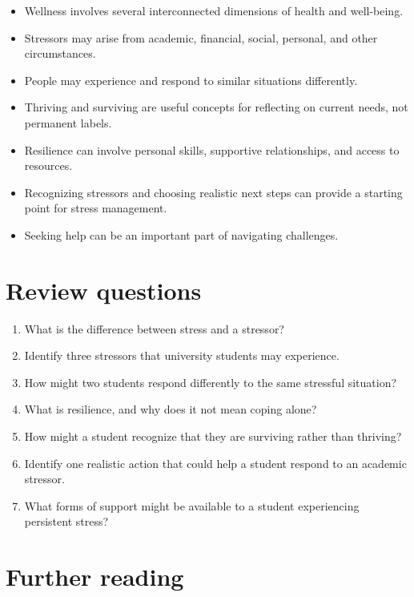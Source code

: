 \documentclass[
  letterpaper,
]{book}
\providecommand{\tightlist}{%
  \setlength{\itemsep}{0pt}\setlength{\parskip}{0pt}}
\begin{document}
\begin{itemize}
\tightlist
\item
  Wellness involves several interconnected dimensions of health and
  well-being.
\item
  Stressors may arise from academic, financial, social, personal, and
  other circumstances.
\item
  People may experience and respond to similar situations differently.
\item
  Thriving and surviving are useful concepts for reflecting on current
  needs, not permanent labels.
\item
  Resilience can involve personal skills, supportive relationships, and
  access to resources.
\item
  Recognizing stressors and choosing realistic next steps can provide a
  starting point for stress management.
\item
  Seeking help can be an important part of navigating challenges.
\end{itemize}

\section{Review questions}\label{review-questions}

\begin{enumerate}
\def\labelenumi{\arabic{enumi}.}
\tightlist
\item
  What is the difference between stress and a stressor?
\item
  Identify three stressors that university students may experience.
\item
  How might two students respond differently to the same stressful
  situation?
\item
  What is resilience, and why does it not mean coping alone?
\item
  How might a student recognize that they are surviving rather than
  thriving?
\item
  Identify one realistic action that could help a student respond to an
  academic stressor.
\item
  What forms of support might be available to a student experiencing
  persistent stress?
\end{enumerate}

\section{Further reading}\label{further-reading}
\end{document}
